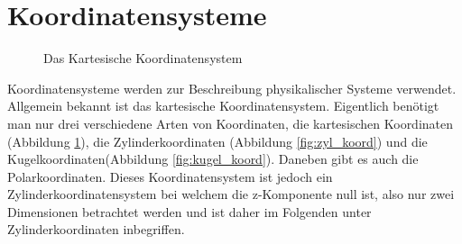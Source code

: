\section{Koordinatensysteme}
\begin{figure}[h]
	\centering
	\caption[Kartesische Koordinaten]{Das Kartesische Koordinatensystem}
	\label{fig:kart_koord}
\end{figure}

Koordinatensysteme werden zur Beschreibung physikalischer Systeme verwendet. Allgemein bekannt ist das kartesische Koordinatensystem.
Eigentlich benötigt man nur drei verschiedene Arten von Koordinaten, die kartesischen Koordinaten (Abbildung \ref{fig:kart_koord}),  die Zylinderkoordinaten (Abbildung \ref{fig:zyl_koord}) und die Kugelkoordinaten(Abbildung \ref{fig:kugel_koord}). 
Daneben gibt es auch die Polarkoordinaten. Dieses Koordinatensystem ist jedoch ein Zylinderkoordinatensystem bei welchem die z-Komponente null ist, also nur zwei Dimensionen betrachtet werden und ist daher im Folgenden unter Zylinderkoordinaten inbegriffen. 

